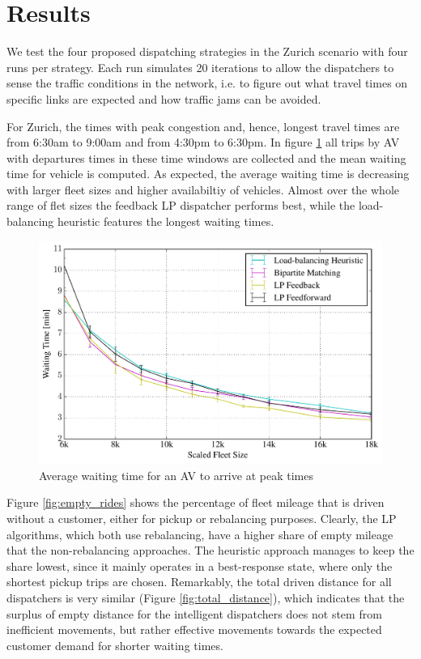 \section{Results}
\label{sec:results}

We test the four proposed dispatching strategies in the Zurich scenario with four runs per strategy. Each run simulates 20 iterations to allow the dispatchers to sense the traffic conditions in the network, i.e. to figure out what travel times on specific links are expected and how traffic jams can be avoided.

For Zurich, the times with peak congestion and, hence, longest travel times are from 6:30am to 9:00am and from 4:30pm to 6:30pm. In figure \ref{fig:mean_peak_waiting_times} all trips by AV with departures times in these time windows are collected and the mean waiting time for vehicle is computed. As expected, the average waiting time is decreasing with larger fleet sizes and higher availabiltiy of vehicles. Almost over the whole range of flet sizes the feedback LP dispatcher performs best, while the load-balancing heuristic features the longest waiting times.

\begin{figure}
\includegraphics[width=1.0\textwidth]{figures/mean_peak_waiting_times.pdf}
\caption{Average waiting time for an AV to arrive at peak times}
\label{fig:mean_peak_waiting_times}
\end{figure}

Figure \ref{fig:empty_rides} shows the percentage of fleet mileage that is driven without a customer, either for pickup or rebalancing purposes. Clearly, the LP algorithms, which both use rebalancing, have a higher share of empty mileage that the non-rebalancing approaches. The heuristic approach manages to keep the share lowest, since it mainly operates in a best-response state, where only the shortest pickup trips are chosen. Remarkably, the total driven distance for all dispatchers is very similar (Figure \ref{fig:total_distance}), which indicates that the surplus of empty distance for the intelligent dispatchers does not stem from inefficient movements, but rather effective movements towards the expected customer demand for shorter waiting times.

